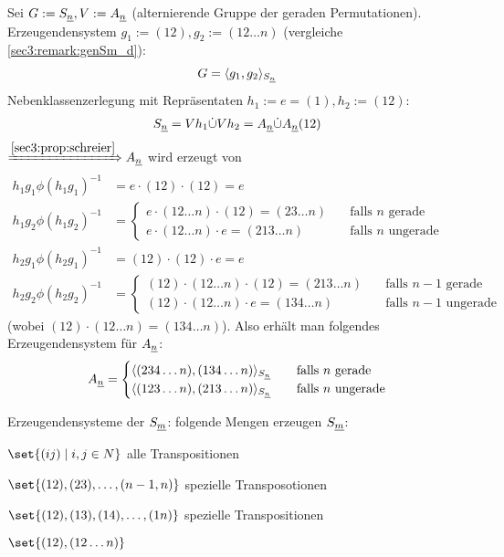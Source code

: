 \begin{example}
	Sei $G := S_{\underline{n}}, V := A_{\underline{n}}$ (alternierende Gruppe der geraden Permutationen). Erzeugendensystem $g_1 := (12), g_2 := (12\dots n)$ (vergleiche \cref{sec3:remark:genSm_d}):
	\begin{align*}
		G = \langle g_1, g_2 \rangle_{S_{\underline{n}}}
	\end{align*}
	Nebenklassenzerlegung mit Repräsentaten $h_1 :=e = (1), h_2 := (12)$:
	\begin{align*}
		S_{\underline{n}} = Vh_1 \dot\cup Vh_2 = A_{\underline{n}} \dot\cup A_{\underline{n}}(12)
	\end{align*}
	$\xRightarrow{\cref{sec3:prop:schreier}} A_{\ul{n}}$ wird erzeugt von
	\begin{align*}
		h_1 g_1 \phi(h_1 g_1)^{-1} &= e \cdot (12) \cdot (12) = e\\
		h_1 g_2 \phi(h_1 g_2)^{-1} &= \begin{cases}
			e \cdot (12\dots n) \cdot (12) = (23\dots n) &\quad \text{falls $n$ gerade}\\
			e \cdot (12\dots n) \cdot e = (213\dots n) &\quad \text{falls $n$ ungerade}
		\end{cases}\\
		h_2 g_1 \phi(h_2 g_1)^{-1} &= (12) \cdot (12) \cdot e = e\\
		h_2 g_2 \phi(h_2 g_2)^{-1} &= \begin{cases}
			(12) \cdot (12\dots n) \cdot (12) = (213\dots n) &\quad \text{falls $n-1$ gerade}\\
			(12) \cdot (12\dots n) \cdot e = (134\dots n) &\quad \text{falls $n-1$ ungerade}
		\end{cases}
	\end{align*}
	(wobei $(12) \cdot (12\dots n) = (134 \dots n)$). Also erhält man folgendes Erzeugendensystem für $A_{\underline{n}}$:
	\begin{align*}
		A_{\underline{n}} = \begin{cases}
			\langle (234\dots n),(134\dots n) \rangle_{S_{\underline{n}}} &\quad \text{falls $n$ gerade}\\
			\langle (123\dots n),(213\dots n) \rangle_{S_{\underline{n}}} &\quad \text{falls $n$ ungerade}
		\end{cases}
	\end{align*}
\end{example}
\begin{remark}
	\label{sec3:remark:genSm} Erzeugendensysteme der $S_{\underline{m}}$: folgende Mengen erzeugen $S_{\underline{m}}$:
	\begin{remarkenum}
		\item $\set{(ij)\mid i,j \in N}$ alle Transpositionen \label{sec3:remark:genSm_a}
		\item $\set{(12), (23), \dots, (n-1,n)}$ spezielle Transposotionen \label{sec3:remark:genSm_b}
		\item $\set{(12),(13),(14), \dots, (1n)}$ spezielle Transpositionen \label{sec3:remark:genSm_c}
		\item $\set{(12),(12\dots n)}$ \label{sec3:remark:genSm_d}
	\end{remarkenum}
\end{remark}
